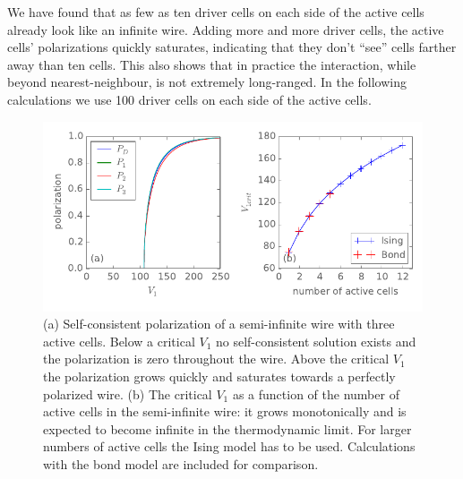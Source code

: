 We have found that as few as ten driver cells on each side of the active cells
already look like an infinite wire. Adding more and more driver cells, the active
cells' polarizations quickly saturates, indicating that they don't ``see'' cells
farther away than ten cells. This also shows that in practice the interaction,
while beyond nearest-neighbour, is not extremely long-ranged. In the following
calculations we use 100 driver cells on each side of the active cells.

\begin{figure}
  \center
  \includegraphics{critical_V1}
  \caption{
  (a) Self-consistent polarization of a semi-infinite wire with three active cells.
  Below a critical $V_1$ no self-consistent solution exists and the polarization
  is zero throughout the wire. Above the critical $V_1$ the polarization grows
  quickly and saturates towards a perfectly polarized wire.
  (b) The critical $V_1$ as a function of the number of active cells in the
  semi-infinite wire: it grows monotonically and is expected to become infinite
  in the thermodynamic limit. For larger numbers of active cells the Ising model
  has to be used. Calculations with the bond model are included for comparison.
  }
  \label{fig:critical_V1}
\end{figure}

